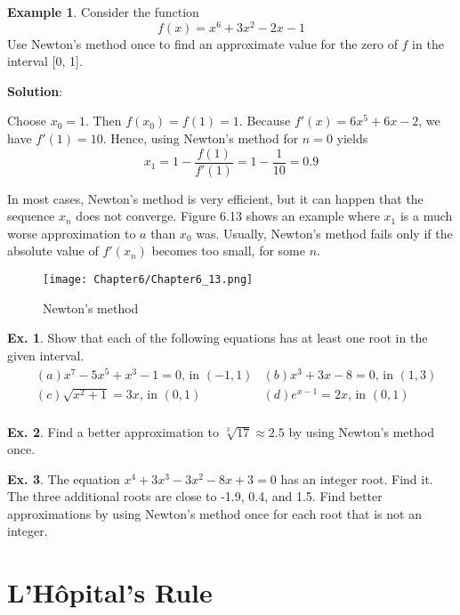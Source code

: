 \documentclass[10pt,a4paper]{book}
\theoremstyle{definition}\newtheorem{definition}{Definition}
\theoremstyle{definition}\newtheorem{fact}{Fact}
\theoremstyle{definition}\newtheorem{ex}{Ex.}
\theoremstyle{definition}\newtheorem{project}{Project}
\theoremstyle{definition}\newtheorem{problem}{Problem}
\theoremstyle{definition}\newtheorem{example}{Example}
\numberwithin{theorem}{chapter}
\numberwithin{corollary}{chapter}
\numberwithin{assumption}{chapter}
\numberwithin{definition}{chapter}
\numberwithin{prop}{chapter}
\numberwithin{notation}{chapter}
\numberwithin{problem}{chapter}
\numberwithin{example}{chapter}
\numberwithin{fact}{chapter}
\numberwithin{ex}{chapter}
\begin{document}
	\begin{example}
		Consider the function
		$$f(x) = x^6 +3x^2-2x-1$$
		Use Newton’s method once to find an approximate value for the zero of $f$ in the interval [0, 1].
		
		\textbf{Solution}:
		
		Choose $x_0 = 1$. Then $f(x_0) = f(1) = 1$. Because $f'(x) = 6x^5 + 6x - 2$, we have $f'(1) = 10$. Hence, using Newton's method for $n = 0$ yields
		$$x_1 = 1 - \frac{f(1)}{f'(1)}= 1 - \frac{1}{10} = 0.9$$
	\end{example}
	
	In most cases, Newton’s method is very efficient, but it can happen that the sequence {$x_n$} does not converge. Figure 6.13 shows an example where $x_1$ is a much worse approximation to $a$ than $x_0$ was. Usually, Newton’s method fails only if the absolute value of $f'(x_n)$ becomes too small, for some $n$.
	\begin{figure}[H]
		\centering
		\texttt{[image: Chapter6/Chapter6\_13.png]}
		\caption{Newton's method}
	\end{figure}
	
	\begin{ex}
		Show that each of the following equations has at least one root in the given interval.
		\begin{align*}
			& (a) x^7-5x^5+x^3-1=0 \text{, in }(-1,1) 
			& (b) x^3+3x-8=0 \text{, in }(1,3)        \\
			& (c) \sqrt{x^2+1}=3x \text{, in }(0,1)   
			& (d) e^{x-1}=2x \text{, in }(0,1)        \\
		\end{align*}
	\end{ex}
	
	\begin{ex}
		Find a better approximation to $\sqrt[3]{17}\approx 2.5$ by using Newton’s method once.
	\end{ex}
	
	\begin{ex}
		The equation $x^4 + 3x^3 - 3x^2 - 8x + 3 = 0$ has an integer root. Find it. The three additional roots are close to -1.9, 0.4, and 1.5. Find better approximations by using Newton’s method once for each root that is not an integer.
	\end{ex}
	
	\section{L'Hôpital’s Rule}
	
\end{document}
